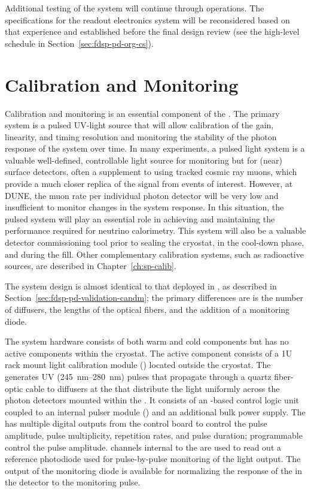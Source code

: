 Additional testing of the system will continue through  operations. The specifications for the readout electronics system will be reconsidered based on that experience and established before the  final design review (see the high-level schedule in Section~\ref{sec:fdsp-pd-org-cs}). 


\section{Calibration and Monitoring}
\label{sec:fdsp-pd-CandM}

Calibration and monitoring is an essential component of the .
The primary system is a pulsed UV-light source that will allow calibration of the  gain, linearity, and timing resolution and monitoring the stability of the photon response of the system over time.
In many experiments, a pulsed light system is a valuable well-defined, controllable light source for monitoring but for (near) surface detectors, often a supplement to using tracked cosmic ray muons, which provide a much closer replica of the signal from events of interest. 
However, at DUNE, the muon rate per individual photon detector will be very low and insufficient to monitor changes in the system response. In this situation, the pulsed system will play an essential role in achieving and maintaining the  performance required for neutrino calorimetry. 
This system will also be a valuable detector commissioning tool prior to sealing the cryostat, in the cool-down phase, and during the \lar fill.
Other complementary calibration systems, such as radioactive sources, are described in Chapter~\ref{ch:sp-calib}. 

The system design is almost identical to that deployed in , as described in Section~\ref{sec:fdsp-pd-validation-candm}; the primary differences are is the number of diffusers, the lengths of the optical fibers, and the addition of a monitoring diode.

The system hardware consists of both warm and cold components but has no active components within the cryostat. The active component consists of a 1U rack mount light calibration module () located outside the cryostat. The  generates UV (\SIrange{245}{280}{nm}) pulses that propagate through a quartz fiber-optic cable to diffusers at the  that distribute the light uniformly across the photon detectors mounted within the . 
It consists of an -based control logic unit coupled to an internal  pulser module () and an additional bulk power supply. 
The  has multiple digital outputs from the control board to control the pulse amplitude, pulse multiplicity, repetition rates, and pulse duration; programmable  control the  pulse amplitude.  channels internal to the  are used to read out a reference photodiode used for pulse-by-pulse monitoring of the  light output. The output of the monitoring diode is available for normalizing the response of the  in the detector to the monitoring pulse. 


